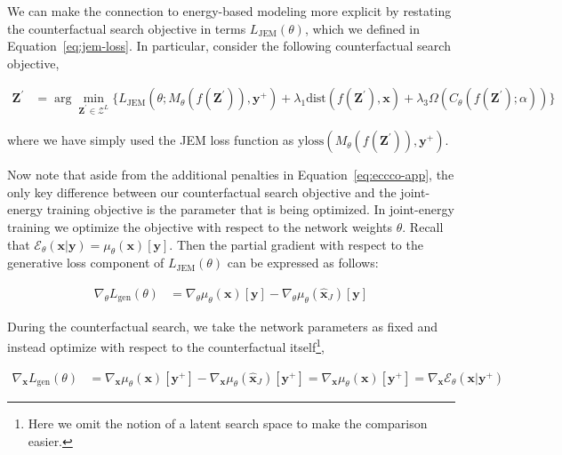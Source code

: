 We can make the connection to energy-based modeling more explicit by restating the counterfactual search objective in terms $L_{\text{JEM}}(\theta)$, which we defined in Equation~\ref{eq:jem-loss}. In particular, consider the following counterfactual search objective,

\begin{equation} \label{eq:eccco-jem}
  \begin{aligned}
  \mathbf{Z}^\prime &= \arg \min_{\mathbf{Z}^\prime \in \mathcal{Z}^L} \{  {L_{\text{JEM}}(\theta;M_{\theta}(f(\mathbf{Z}^\prime)),\mathbf{y}^+)}+ \lambda_{1} {\text{dist}(f(\mathbf{Z}^\prime),\mathbf{x}) }  + \lambda_3 \Omega(C_{\theta}(f(\mathbf{Z}^\prime);\alpha)) \} 
  \end{aligned} 
\end{equation}

where we have simply used the JEM loss function as $\text{yloss}(M_{\theta}(f(\mathbf{Z}^\prime)),\mathbf{y}^+)$.

Now note that aside from the additional penalties in Equation~\ref{eq:eccco-app}, the only key difference between our counterfactual search objective and the joint-energy training objective is the parameter that is being optimized. In joint-energy training we optimize the objective with respect to the network weights $\theta$. Recall that $\mathcal{E}_{\theta}(\mathbf{x}|\mathbf{y})=\mu_{\theta}(\mathbf{x})[\mathbf{y}]$. Then the partial gradient with respect to the generative loss component of $L_{\text{JEM}}(\theta)$ can be expressed as follows:

\begin{equation}\label{eq:jem-grad}
  \begin{aligned}
    \nabla_{\theta}L_{\text{gen}}(\theta) &= \nabla_{\theta}\mu_{\theta}(\mathbf{x})[\mathbf{y}]- \nabla_{\theta}\mu_{\theta}(\hat{\mathbf{x}}_{J})[\mathbf{y}]
  \end{aligned}
\end{equation}

During the counterfactual search, we take the network parameters as fixed and instead optimize with respect to the counterfactual itself\footnote{Here we omit the notion of a latent search space to make the comparison easier.},

\begin{equation}\label{eq:ce-grad}
  \begin{aligned}
    \nabla_{\mathbf{x}}L_{\text{gen}}(\theta) &= \nabla_{\mathbf{x}}\mu_{\theta}(\mathbf{x})[\mathbf{y}^+]- \nabla_{\mathbf{x}}\mu_{\theta}(\hat{\mathbf{x}}_{J})[\mathbf{y}^+]=\nabla_{\mathbf{x}}\mu_{\theta}(\mathbf{x})[\mathbf{y}^+]=\nabla_{\mathbf{x}}\mathcal{E}_{\theta}(\mathbf{x}|\mathbf{y}^+)
  \end{aligned}
\end{equation}

